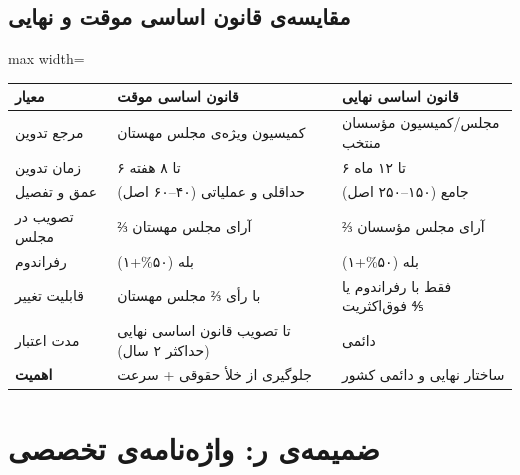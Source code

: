 \documentclass[12pt,a4paper,twoside,openany]{book}
\begin{document}
	\section{مقایسه‌ی قانون اساسی موقت و نهایی}
	
	\vspace{0.5\baselineskip}
	\noindent
	\begin{adjustbox}{max width=\linewidth}
		\begin{tabular}{@{}p{3.5cm}p{5cm}p{5cm}@{}}
			\toprule
			\textbf{معیار} & \textbf{قانون اساسی موقت} & \textbf{قانون اساسی نهایی} \\
			\midrule
			مرجع تدوین & کمیسیون ویژه‌ی مجلس مهستان & مجلس/کمیسیون مؤسسان منتخب \\
			\addlinespace
			\rowcolor{MahestanLightGray}
			زمان تدوین & ۶ تا ۸ هفته & ۶ تا ۱۲ ماه \\
			\addlinespace
			عمق و تفصیل & حداقلی و عملیاتی (۴۰--۶۰ اصل) & جامع (۱۵۰--۲۵۰ اصل) \\
			\addlinespace
			\rowcolor{MahestanLightGray}
			تصویب در مجلس & ⅔ آرای مجلس مهستان & ⅔ آرای مجلس مؤسسان \\
			\addlinespace
			رفراندوم & بله (۵۰\%+۱) & بله (۵۰\%+۱) \\
			\addlinespace
			\rowcolor{MahestanLightGray}
			قابلیت تغییر & با رأی ⅔ مجلس مهستان & فقط با رفراندوم یا فوق‌اکثریت ⅘ \\
			\addlinespace
			مدت اعتبار & تا تصویب قانون اساسی نهایی (حداکثر ۲ سال) & دائمی \\
			\addlinespace
			\rowcolor{SuccessBg}
			\textbf{اهمیت} & جلوگیری از خلأ حقوقی + سرعت & ساختار نهایی و دائمی کشور \\
			\bottomrule
		\end{tabular}
	\end{adjustbox}
	
	\chapter{ضمیمه‌ی ر: واژه‌نامه‌ی تخصصی}
	\label{app:glossary}
	
\end{document}
